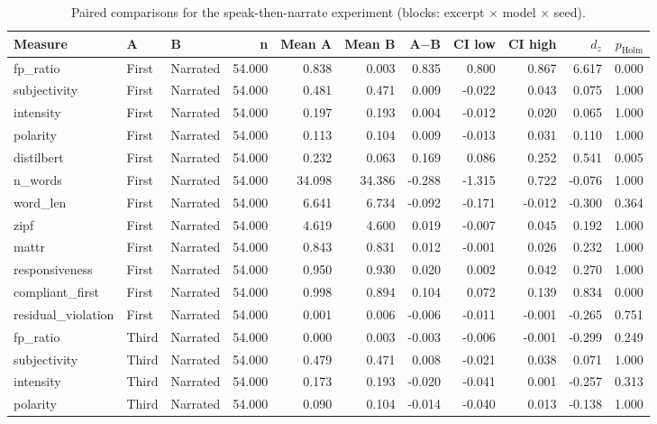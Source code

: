 \documentclass[10pt]{article}
\begin{document}
{\scriptsize
\begin{longtable}{lllrrrrrrrr}
\caption{Paired comparisons for the speak-then-narrate experiment (blocks: excerpt $\times$ model $\times$ seed).}\\
\toprule
Measure & A & B & n & Mean A & Mean B & A$-$B & CI low & CI high & $d_z$ & $p_\mathrm{Holm}$ \\
\midrule
\endhead
fp\_ratio & First & Narrated & 54.000 & 0.838 & 0.003 & 0.835 & 0.800 & 0.867 & 6.617 & 0.000 \\
subjectivity & First & Narrated & 54.000 & 0.481 & 0.471 & 0.009 & -0.022 & 0.043 & 0.075 & 1.000 \\
intensity & First & Narrated & 54.000 & 0.197 & 0.193 & 0.004 & -0.012 & 0.020 & 0.065 & 1.000 \\
polarity & First & Narrated & 54.000 & 0.113 & 0.104 & 0.009 & -0.013 & 0.031 & 0.110 & 1.000 \\
distilbert & First & Narrated & 54.000 & 0.232 & 0.063 & 0.169 & 0.086 & 0.252 & 0.541 & 0.005 \\
n\_words & First & Narrated & 54.000 & 34.098 & 34.386 & -0.288 & -1.315 & 0.722 & -0.076 & 1.000 \\
word\_len & First & Narrated & 54.000 & 6.641 & 6.734 & -0.092 & -0.171 & -0.012 & -0.300 & 0.364 \\
zipf & First & Narrated & 54.000 & 4.619 & 4.600 & 0.019 & -0.007 & 0.045 & 0.192 & 1.000 \\
mattr & First & Narrated & 54.000 & 0.843 & 0.831 & 0.012 & -0.001 & 0.026 & 0.232 & 1.000 \\
responsiveness & First & Narrated & 54.000 & 0.950 & 0.930 & 0.020 & 0.002 & 0.042 & 0.270 & 1.000 \\
compliant\_first & First & Narrated & 54.000 & 0.998 & 0.894 & 0.104 & 0.072 & 0.139 & 0.834 & 0.000 \\
residual\_violation & First & Narrated & 54.000 & 0.001 & 0.006 & -0.006 & -0.011 & -0.001 & -0.265 & 0.751 \\
fp\_ratio & Third & Narrated & 54.000 & 0.000 & 0.003 & -0.003 & -0.006 & -0.001 & -0.299 & 0.249 \\
subjectivity & Third & Narrated & 54.000 & 0.479 & 0.471 & 0.008 & -0.021 & 0.038 & 0.071 & 1.000 \\
intensity & Third & Narrated & 54.000 & 0.173 & 0.193 & -0.020 & -0.041 & 0.001 & -0.257 & 0.313 \\
polarity & Third & Narrated & 54.000 & 0.090 & 0.104 & -0.014 & -0.040 & 0.013 & -0.138 & 1.000 \\

\end{longtable}}
\end{document}
